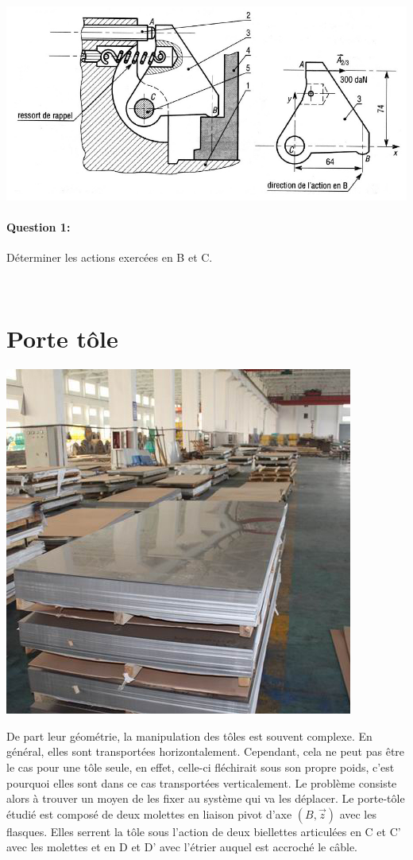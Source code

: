 \begin{center}
 \includegraphics[width=0.9\linewidth]{img/Bride.jpg}
\end{center}

\paragraph{Question 1:} Déterminer les actions exercées en B et C.

\newpage

~\

\newpage

\section{Porte tôle}

\begin{minipage}{0.4\linewidth}
 \centering\includegraphics[width=0.7\linewidth]{img/tole_hor.jpg}
\end{minipage}
\hfill
\begin{minipage}{0.56\linewidth}
De part leur géométrie, la manipulation des tôles est souvent complexe. En général, elles sont transportées horizontalement. Cependant, cela ne peut pas être le cas pour une tôle seule, en effet, celle-ci fléchirait sous son propre poids, c'est pourquoi elles sont dans ce cas transportées verticalement. Le problème consiste alors à trouver un moyen de les fixer au système qui va les déplacer. Le porte-tôle étudié est composé de deux molettes en liaison pivot d'axe $(B,\overrightarrow{z})$ avec les flasques. Elles serrent la tôle sous l'action de deux biellettes articulées en C et C' avec les molettes et en D et D' avec l'étrier auquel est accroché le câble.
\end{minipage}

